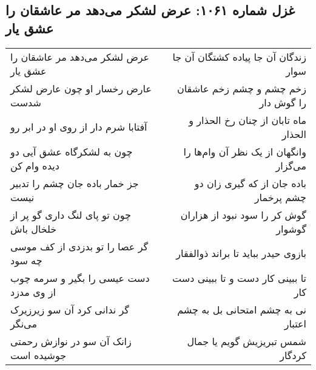 \begin{center}
\section*{غزل شماره ۱۰۶۱: عرض لشکر می‌دهد مر عاشقان را عشق یار}
\label{sec:1061}
\begin{longtable}{l p{0.5cm} r}
عرض لشکر می‌دهد مر عاشقان را عشق یار
&&
زندگان آن جا پیاده کشتگان آن جا سوار
\\
عارض رخسار او چون عارض لشکر شدست
&&
زخم چشم و چشم زخم عاشقان را گوش دار
\\
آفتابا شرم دار از روی او در ابر رو
&&
ماه تابان از چنان رخ الحذار و الحذار
\\
چون به لشکرگاه عشق آیی دو دیده وام کن
&&
وانگهان از یک نظر آن وام‌ها را می‌گزار
\\
جز خمار باده جان چشم را تدبیر نیست
&&
باده جان از که گیری زان دو چشم پرخمار
\\
چون تو پای لنگ داری گو پر از خلخال باش
&&
گوش کر را سود نبود از هزاران گوشوار
\\
گر عصا را تو بدزدی از کف موسی چه سود
&&
بازوی حیدر بباید تا براند ذوالفقار
\\
دست عیسی را بگیر و سرمه چوب از وی مدزد
&&
تا ببینی کار دست و تا ببینی دست کار
\\
گر ندانی کرد آن سو زیرزیرک می‌نگر
&&
نی به چشم امتحانی بل به چشم اعتبار
\\
زانک آن سو در نوازش رحمتی جوشیده است
&&
شمس تبریزیش گویم یا جمال کردگار
\\
\end{longtable}
\end{center}
